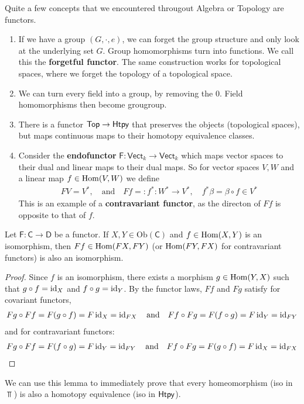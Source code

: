 \begin{ex}[]
  Quite a few concepts that we encountered througout Algebra or Topology are functors.
  \begin{enumerate}
    \item If we have a group $(G,\cdot,e)$, we can forget the group structure and only look at the underlying set $G$.
      Group homomorphisms turn into functions.
      We call this the \textbf{forgetful functor}.
      The same construction works for topological spaces, where we forget the topology of a topological space.
    \item We can turn every field into a group, by removing the $0$. Field homomorphisms then become grougroup.
    \item There is a functor $\text{\sffamily Top} \to \text{\sffamily Htpy}$ that preserves the objects (topological spaces), but maps continuous maps to their homotopy equivalence classes.
    \item Consider the \textbf{endofunctor} $\textsf{F}: \textsf{Vect}_k \to  \textsf{Vect}_k$ which maps vector spaces to their dual and linear maps to their dual maps.
      So for vector spaces $V,W$ and a linear map $f \in \operatorname{Hom}(V,W)$ we define
      \begin{align*}
        F V = V^{\ast}, \quad \text{and} \quad Ff =: f^{\ast}: W^{\ast} \to  V^{\ast}, \quad f^{\ast} \beta = \beta \circ f \in V^{\ast}
      \end{align*}
      This is an example of a \textbf{contravariant functor}, as the directon of $Ff$ is opposite to that of $f$.
  \end{enumerate}
\end{ex}


\begin{lem}[]\label{lem:func-iso}
Let $\textsf{F}: \textsf{C} \to  \textsf{D}$ be a functor.
If $X,Y \in \text{Ob}(\textsf{C})$ and $f \in \operatorname{Hom}(X,Y)$ is an isomorphism, then $Ff \in \operatorname{Hom}(FX,FY)$ (or $\operatorname{Hom}(FY,FX)$ for contravariant functors) is also an isomorphism.
\end{lem}
\begin{proof}
  Since $f$ is an isomorphism, there exists a morphism $g \in \operatorname{Hom}(Y,X)$ such that $g \circ f = \operatorname{id}_X$ and $f \circ g = \operatorname{id}_Y$.
  By the functor laws, $Ff$ and $Fg$ satisfy for covariant functors, 
  \begin{align*}
    Fg \circ Ff = F(g \circ f) = F \operatorname{id}_X = \operatorname{id}_{FX} \quad \text{and} \quad Ff \circ Fg = F(f \circ g) = F \operatorname{id}_Y = \operatorname{id}_{FY}
  \end{align*}
  and for contravariant functors:
  \begin{align*}
    Fg \circ Ff = F(f \circ g) = F \operatorname{id}_Y = \operatorname{id}_{F Y} \quad \text{and} \quad Ff \circ Fg = F(g \circ f) = F \operatorname{id}_X = \operatorname{id}_{F X}
  \end{align*}
\end{proof}
We can use this lemma to immediately prove that every homeomorphism (iso in $\Top$) is also a homotopy equivalence (iso in $\text{\sffamily Htpy}$).


